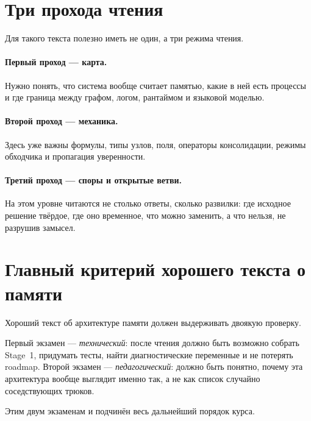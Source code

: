 \section{Три прохода чтения}

Для такого текста полезно иметь не один, а три режима чтения.

\paragraph{Первый проход — карта.} Нужно понять, что система вообще считает памятью,
какие в ней есть процессы и где граница между графом, логом, рантаймом и языковой
моделью.

\paragraph{Второй проход — механика.} Здесь уже важны формулы, типы узлов, поля,
операторы консолидации, режимы обходчика и пропагация уверенности.

\paragraph{Третий проход — споры и открытые ветви.} На этом уровне читаются не
столько ответы, сколько развилки: где исходное решение твёрдое, где оно временное,
что можно заменить, а что нельзя, не разрушив замысел.

\section{Главный критерий хорошего текста о памяти}

Хороший текст об архитектуре памяти должен выдерживать двоякую проверку.

\begin{principle}
Первый экзамен — \emph{технический}: после чтения должно быть возможно собрать Stage~1,
придумать тесты, найти диагностические переменные и не потерять roadmap. Второй
экзамен — \emph{педагогический}: должно быть понятно, почему эта архитектура вообще
выглядит именно так, а не как список случайно соседствующих трюков.
\end{principle}

Этим двум экзаменам и подчинён весь дальнейший порядок курса.
